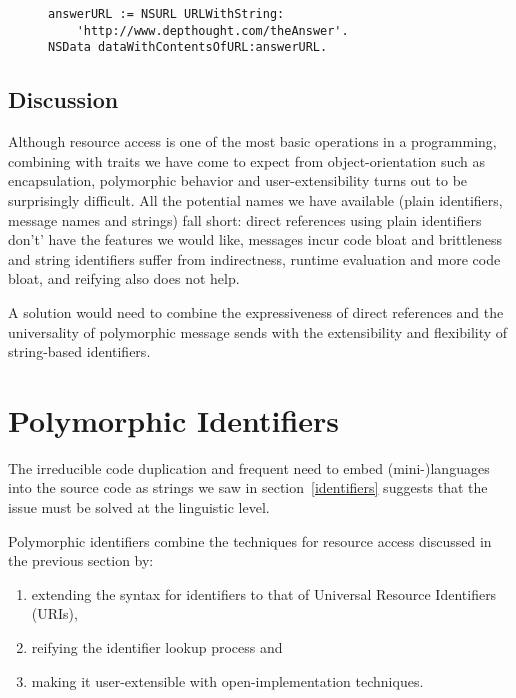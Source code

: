 \documentclass[preprint,authoryear]{acm_proc_article-sp}
\begin{document}
\begin{figure}[htbp]
\begin{lstlisting}[style=numbers,label=reified-identifiers,caption=Reified identifier.]
answerURL := NSURL URLWithString:
	'http://www.depthought.com/theAnswer'.
NSData dataWithContentsOfURL:answerURL.
\end{lstlisting}
\end{figure}



\subsection{Discussion}

Although resource access is one of the most basic operations in a programming, combining
with traits we have come to expect from object-orientation such as encapsulation, polymorphic
behavior and user-extensibility turns out to be surprisingly difficult.   All the potential names
we have available (plain identifiers, message names and strings) fall short:  direct references
using plain identifiers don't' have the features we would like, messages incur code bloat
and brittleness and string identifiers suffer from indirectness, runtime evaluation and more
code bloat, and reifying also does not help.

A solution would need to combine the expressiveness of direct references and the universality
of polymorphic message sends with the extensibility and flexibility of string-based identifiers.



\section{Polymorphic Identifiers}
\label{polymorphic-identifiers}

The irreducible code duplication and frequent need to embed (mini-)languages into the
source code as strings we saw in section~\ref{identifiers} suggests that the issue must be
solved at the linguistic level.

Polymorphic identifiers combine the techniques for resource access discussed in the previous 
section by:
\begin{enumerate}
\item extending the syntax for identifiers to that of Universal Resource Identifiers (URIs)\cite{rfc3986},
\item reifying the identifier lookup process and
\item making it user-extensible with open-implementation techniques.
\end{enumerate}
\end{document}

